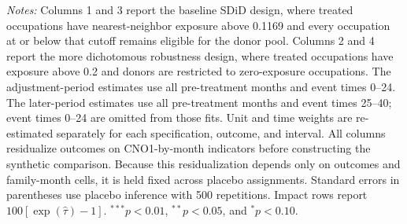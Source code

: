 \begin{table}[H]
\begin{threeparttable}
\begin{tablenotes}[flushleft]
\item \emph{Notes:} Columns 1 and 3 report the baseline SDiD design, where treated occupations have nearest-neighbor exposure above 0.1169 and every occupation at or below that cutoff remains eligible for the donor pool. Columns 2 and 4 report the more dichotomous robustness design, where treated occupations have exposure above 0.2 and donors are restricted to zero-exposure occupations. The adjustment-period estimates use all pre-treatment months and event times 0--24. The later-period estimates use all pre-treatment months and event times 25--40; event times 0--24 are omitted from those fits. Unit and time weights are re-estimated separately for each specification, outcome, and interval. All columns residualize outcomes on CNO1-by-month indicators before constructing the synthetic comparison. Because this residualization depends only on outcomes and family-month cells, it is held fixed across placebo assignments. Standard errors in parentheses use placebo inference with 500 repetitions. Impact rows report $100[\exp(\widehat{\tau})-1]$. $^{***}p<0.01$, $^{**}p<0.05$, and $^{*}p<0.10$.
\end{tablenotes}
\end{threeparttable}
\end{table}
